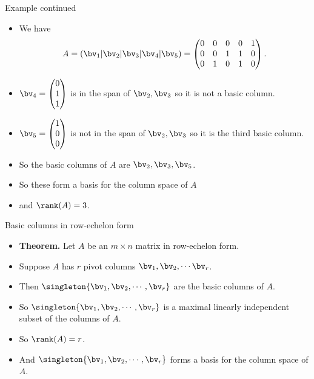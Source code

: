 \documentclass{beamer}
\begin{document}
\begin{frame}{Example continued}

\begin{itemize}
\item We have
$$A = \left(\bv_1 \vert \bv_2 \vert \bv_3 \vert \bv_4 \vert \bv_5 \right) =
\begin{pmatrix}
0 & 0 & 0 & 0 & 1 \\
0 & 0 & 1 & 1 & 0 \\
0 & 1 & 0 & 1 & 0 \\
\end{pmatrix}.
$$
\item $\bv_4
=
\begin{pmatrix}
0 \\
1 \\
1 \\
\end{pmatrix}
$
is in the span of $\bv_2,\bv_3$ so it is not a basic column.
\item $\bv_5
=
\begin{pmatrix}
1 \\
0 \\
0 \\
\end{pmatrix}
$
is not in the span of $\bv_2,\bv_3$ so it is the third basic column.
\item So the basic columns of $A$ are $\bv_2,\bv_3,\bv_5$.
\item So these form a basis for the column space of $A$
\item and $\rank(A) = 3$.
\end{itemize}

\end{frame}

\begin{frame}{Basic columns in row-echelon form}

\begin{itemize}
\item \textbf{Theorem.} Let $A$ be an $m\times n$ matrix in row-echelon form.
\item Suppose $A$ has $r$ pivot columns $\bv_1,\bv_2,\cdots\bv_r$.
\item Then $\singleton{\bv_1,\bv_2,\cdots,\bv_r}$ are the basic columns of $A$.
\item So $\singleton{\bv_1,\bv_2,\cdots,\bv_r}$ is a maximal linearly independent subset of the columns of $A$.
\item So $\rank(A)=r$.
\item And $\singleton{\bv_1,\bv_2,\cdots,\bv_r}$ forms a basis for the column space of $A$.
\end{itemize}

\end{frame}
\end{document}

